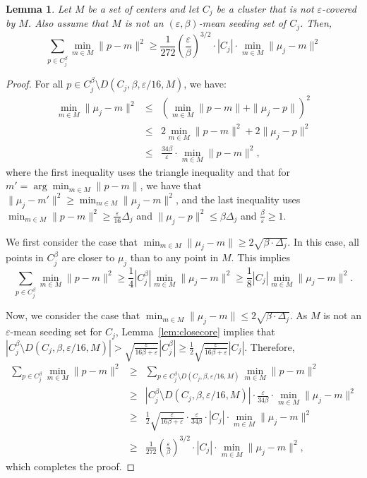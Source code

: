 \documentclass[11pt]{article}
\newtheorem{lemma}[theorem]{Lemma}
\begin{document}
\begin{lemma}
\label{lem:lbdist}
Let $M$ be a set of centers and let $C_j$ be a cluster that is not $\varepsilon$-covered by $M$. Also assume that $M$ is 
not an $(\varepsilon,\beta)$-mean seeding set of $C_j$. Then,
$$\sum_{p\in C_j^\beta} \min_{m\in M}\|p-m\|^2 \geq \frac{1}{272}\left(\frac{\varepsilon}{\beta}\right)^{3/2}\cdot |C_j| \cdot \min_{m\in M}\|\mu_j-m\|^2$$
\end{lemma}
\begin{proof}
For all $p\in C_j^\beta\setminus D(C_j,\beta,\varepsilon/16,M)$, we have:
\begin{eqnarray*}
       \min_{m\in M}\|\mu_j-m\|^2 
&\leq& \left(\min_{m\in M}\|p-m\| + \|\mu_j-p\|\right)^2 \\
&\leq& 2\min_{m\in M}\|p-m\|^2 + 2\|\mu_j-p\|^2 \\
&\leq& \frac{34\beta}{\varepsilon}\cdot\min_{m\in M}\|p-m\|^2,
\end{eqnarray*}
where the first inequality uses the triangle inequality and that for $m' = \arg\min_{m\in M}\|p-m\|$, we have that $\|\mu_j-m'\|^2\ge \min_{m\in M}\|\mu_j-m\|^2$, and the last inequality uses $\min_{m\in M}\|p-m\|^2\ge \frac{\varepsilon}{16}\Delta_j$ 
and $\|\mu_j-p\|^2\le \beta\Delta_j$ and $\frac{\beta}{\varepsilon} \ge 1$.

We first consider the case that $\min_{m\in M}\|\mu_j-m\| \geq 2\sqrt{\beta\cdot \Delta_j}$. In this case, all points in $C_j^\beta$ are closer to $\mu_j$ than to any point in $M$.
This implies 
$$\sum_{p\in C_j^\beta} \min_{m\in M}\|p-m\|^2 \geq \frac{1}{4}|C_j^\beta| \min_{m\in M}\|\mu_j-m\|^2 \geq \frac{1}{8}|C_j|\min_{m\in M}\|\mu_j-m\|^2.$$

Now, we consider the case that $\min_{m\in M}\|\mu_j-m\| \leq 2\sqrt{\beta\cdot \Delta_j}$.
As $M$ is not an $\varepsilon$-mean seeding set for $C_j$, Lemma~\ref{lem:closecore} implies that
$|C_j^\beta\setminus D(C_j,\beta,\varepsilon/16,M)| > \sqrt{\frac{\varepsilon}{16\beta+\varepsilon}} |C_j^\beta|\ge \frac 1 2 \sqrt{\frac{\varepsilon}{16\beta+\varepsilon}} |C_j|$. Therefore,
\begin{eqnarray*}
      \sum_{p\in C_j^\beta} \min_{m\in M}\|p-m\|^2
&\ge& \sum_{p\in C_j^\beta\setminus D(C_j,\beta,\varepsilon/16,M)} \min_{m\in M}\|p-m\|^2 \\
&\ge& |C_j^\beta\setminus D(C_j,\beta,\varepsilon/16,M)|\cdot \frac{\varepsilon}{34\beta}\cdot\min_{m\in M}\|\mu_j-m\|^2 \\
&\ge& \frac 1 2 \sqrt{\frac{\varepsilon}{16\beta + \varepsilon}}\cdot\frac{\varepsilon}{34\beta}\cdot |C_j|\cdot\min_{m\in M}\|\mu_j-m\|^2 \\
&\ge& \frac{1}{272}\left(\frac{\varepsilon}{\beta}\right)^{3/2}\cdot |C_j|\cdot\min_{m\in M}\|\mu_j-m\|^2,
\end{eqnarray*}
which completes the proof.
\end{proof}
\end{document}
